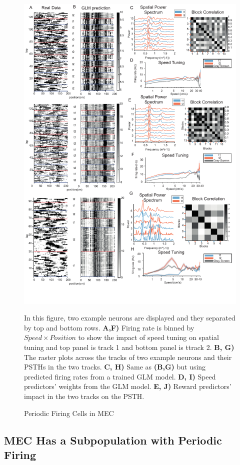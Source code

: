 \begin{figure}
    \centering
    \includegraphics[width=1\linewidth]{figures//Chapter 5 MEC/fig4_periodic_firing.pdf}
    \caption{Periodic Firing Cells in MEC}
    \label{fig:placeholder}
    \medskip
\small
In this figure, two example neurons are displayed and they separated by top and bottom rows. \textbf{A,F)} Firing rate is binned by \(Speed \times Position\) to show the impact of speed tuning on spatial tuning and top panel is track 1 and bottom panel is ttrack 2. \textbf{B, G)} The raster plots across the tracks of two example neurons and their PSTHs in the two tracks. \textbf{C, H)} Same as \textbf{(B,G)} but using predicted firing rates from a trained GLM model. \textbf{D, I)} Speed predictors' weights from the GLM model. \textbf{E, J)} Reward predictors' impact in the two tracks on the PSTH.
\end{figure}
\subsection{MEC Has a Subpopulation with Periodic Firing}
